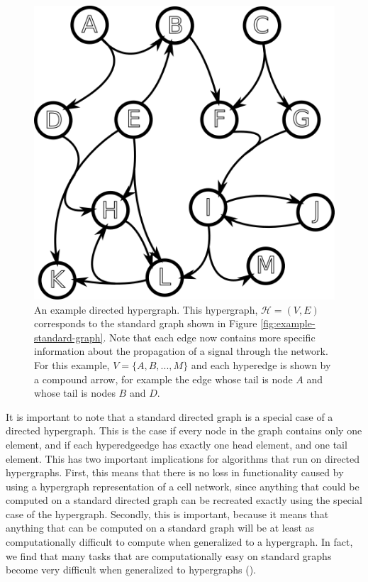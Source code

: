 \documentclass[12pt,twoside]{reedthesis}
\theoremstyle{definition}
\begin{document}
\begin{figure}[thbp]
  \begin{center}
    \includegraphics[width=\textwidth/2]{example-hypergraph}
  \caption[An example directed hypergraph.]{An example directed hypergraph. This hypergraph, $\mathcal{H}=(V,E)$ corresponds to the standard graph shown in Figure \ref{fig:example-standard-graph}. Note that each edge now contains more specific information about the propagation of a signal through the network. For this example, $V=\{A,B,...,M\}$ and each hyperedge is shown by a compound arrow, for example the edge whose tail is node $A$ and whose tail is nodes $B$ and $D$.}
  \label{fig:example-hypergraph}
  \end{center}
\end{figure}

It is important to note that a standard directed graph is a special case of a directed hypergraph.  This is the case if every node in the graph contains only one element, and if each hyperedgeedge has exactly one head element, and one tail element.  This has two important implications for algorithms that run on directed hypergraphs.  First, this means that there is no loss in functionality caused by using a hypergraph representation of a cell network, since anything that could be computed on a standard directed graph can be recreated exactly using the special case of the hypergraph. Secondly, this is important, because it means that anything that can be computed on a standard graph will be at least as computationally difficult to compute when generalized to a hypergraph.  In fact, we find that many tasks that are computationally easy on standard graphs become very difficult when generalized to hypergraphs (\cite{Ritz2014a}).\par
\end{document}
